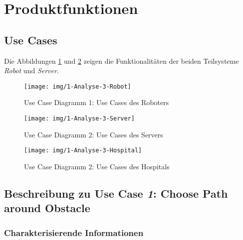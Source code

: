 \section{Produktfunktionen}

		\subsection{Use Cases}
		
		Die Abbildungen \ref{fig:3-1-robot-use-cases} und \ref{fig:3-1-server-use-cases} zeigen die Funktionalitäten der beiden Teilsysteme \emph{Robot} und \emph{Server}.
		
			\begin{figure}[H]
				\centering
				\texttt{[image: img/1-Analyse-3-Robot]}
				\caption{Use Case Diagramm 1: Use Cases des Roboters}
				\label{fig:3-1-robot-use-cases}
			\end{figure}

			\begin{figure}[H]
				\centering
				\texttt{[image: img/1-Analyse-3-Server]}
				\caption{Use Case Diagramm 2: Use Cases des Servers}
				\label{fig:3-1-server-use-cases}
			\end{figure}

			\begin{figure}[H]
				\centering
				\texttt{[image: img/1-Analyse-3-Hospital]}
				\caption{Use Case Diagramm 2: Use Cases des Hospitals}
				\label{fig:3-1-hospital-use-cases}
			\end{figure}

		\pagebreak

		\subsection{Beschreibung zu Use Case \emph{1}: Choose Path around Obstacle}

			\subsubsection*{Charakterisierende Informationen}

